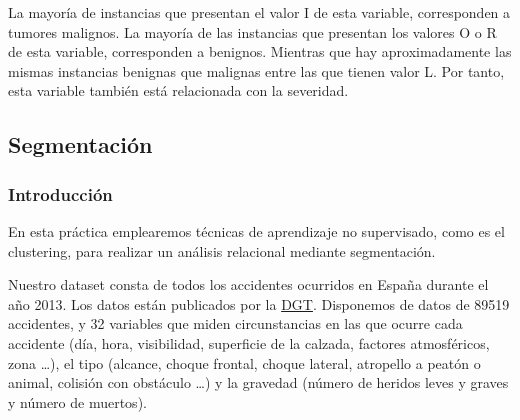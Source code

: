 \documentclass[oneside]{book}
\begin{document}
La mayoría de instancias que presentan el valor I de esta variable,
corresponden a tumores malignos. La mayoría de las instancias que
presentan los valores O o R de esta variable, corresponden a
benignos. Mientras que hay aproximadamente las mismas instancias
benignas que malignas entre las que tienen valor L. Por tanto, esta
variable también está relacionada con la severidad.

\begin{center}
\vspace*{8cm}
\part{\textbf{Segmentación}}
\end{center}

\setcounter{section}{0}
\renewcommand*{\theHsection}{\theHpart.\the\value{section}}

\section{Introducción}

En esta práctica emplearemos técnicas de aprendizaje no supervisado,
como es el clustering, para realizar un análisis relacional mediante
segmentación.

Nuestro dataset consta de todos los accidentes ocurridos en España
durante el año 2013. Los datos están publicados por la
\href{https://sedeapl.dgt.gob.es/WEB_IEST_CONSULTA/subcategoria.faces}{DGT}. Disponemos
de datos de 89519 accidentes, y 32 variables que miden circunstancias
en las que ocurre cada accidente (día, hora, visibilidad, superficie
de la calzada, factores atmosféricos, zona \ldots), el tipo (alcance,
choque frontal, choque lateral, atropello a peatón o animal, colisión
con obstáculo \ldots) y la gravedad (número de heridos leves y graves y
número de muertos).
\end{document}
